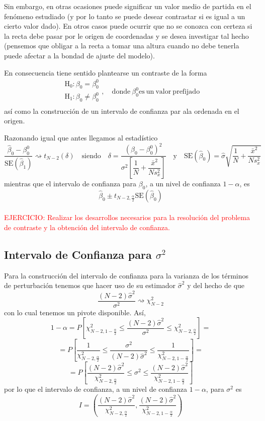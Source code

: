 \documentclass[10pt,a4paper]{book}
\begin{document}
Sin embargo, en otras ocasiones puede significar un valor medio de partida en el fenómeno estudiado (y por lo tanto se puede desear contrastar si es igual a un cierto valor dado). En otros casos puede ocurrir que no se conozca con certeza si la recta debe pasar por le origen de coordenadas y se desea investigar tal hecho (pensemos que obligar a la recta a tomar una altura cuando no debe tenerla puede afectar a la bondad de ajuste del modelo).

En consecuencia tiene sentido plantearse un contraste de la forma 
$$
\begin{array}{c}
\mathrm{H}_0:\beta_0=\beta^0_0\\
\mathrm{H}_1:\beta_0\neq\beta^0_0\\
\end{array}
,\quad \mathrm{donde}\ \beta^0_0 \mathrm{es\ un\ valor\ prefijado}
$$
así como la construcción de un intervalo de confianza par ala ordenada en el origen.

Razonando igual que antes llegamos al estadístico
$$\dfrac{\widehat{\beta}_0-\beta^0_0}{\mathrm{SE}(\widehat{\beta}_1)}\rightsquigarrow t_{N-2}(\delta)\quad\mathrm{siendo}\quad \delta=\dfrac{(\beta_0-\beta^0_0)^2}{\sigma^2\left[\dfrac{1}{N}+\dfrac{\bar{x}^2}{Ns^2_x}\right]}\quad\mathrm{y}\quad\mathrm{SE}(\widehat{\beta}_0)=\widehat{\sigma}\sqrt{\frac{1}{N}+\frac{\bar{x}^2}{Ns^2_x}}$$
mientras que el intervalo de confianza para $\beta_0$, a un nivel de confianza $1-\alpha$, es $$\widehat{\beta}_0\pm t_{N-2,\frac{\alpha}{2}}\mathrm{SE}(\widehat{\beta}_0)$$
\ \\

\textcolor{red}{EJERCICIO: Realizar los desarrollos necesarios para la resolución del problema de contraste y la obtención del intervalo de confianza.}
\ \\

		\subsection{Intervalo de Confianza para $\sigma^2$}
Para la construcción del intervalo de confianza para la varianza de los términos de perturbación tenemos que hacer uso de su estimador $\widehat{\sigma}^2$ y del hecho de que $$\dfrac{(N-2)\widehat{\sigma}^2}{\sigma^2}\rightsquigarrow \chi^2_{N-2}$$
con lo cual tenemos un pivote disponible. Así,
$$1-\alpha=P\left[\chi^2_{N-2,1-\frac{\alpha}{2}}\leq\dfrac{(N-2)\widehat{\sigma}^2}{\sigma^2}\leq\chi^2_{N-2,\frac{\alpha}{2}}\right]=$$
$$=P\left[\dfrac{1}{\chi^2_{N-2,\frac{\alpha}{2}}}\leq\dfrac{\sigma^2}{(N-2)\widehat{\sigma}^2}\leq\dfrac{1}{\chi^2_{N-2,1-\frac{\alpha}{2}}}\right]=$$	
$$=P\left[\dfrac{(N-2)\widehat{\sigma}^2}{\chi^2_{N-2,\frac{\alpha}{2}}}\leq\sigma^2\leq\dfrac{(N-2)\widehat{\sigma}^2}{\chi^2_{N-2,1-\frac{\alpha}{2}}}\right]$$
por lo que el intervalo de confianza, a un nivel de confianza $1-\alpha$, para $\sigma^2$ es $$I=\left(\dfrac{(N-2)\widehat{\sigma}^2}{\chi^2_{N-2,\frac{\alpha}{2}}},\dfrac{(N-2)\widehat{\sigma}^2}{\chi^2_{N-2,1-\frac{\alpha}{2}}}\right)$$
\end{document}
